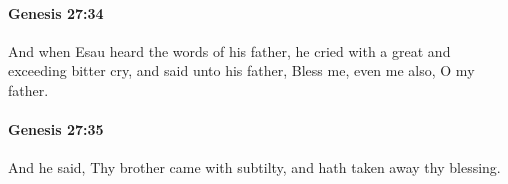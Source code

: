 		\paragraph{Genesis 27:34} %
			\label{GENESIS-27-34}

			And when Esau heard the words of his father, he cried with a great and exceeding bitter cry, and said unto his father, Bless me, even me also, O my father.


		\paragraph{Genesis 27:35} %
			\label{GENESIS-27-35}

			And he said, Thy brother came with subtilty, and hath taken away thy blessing.


